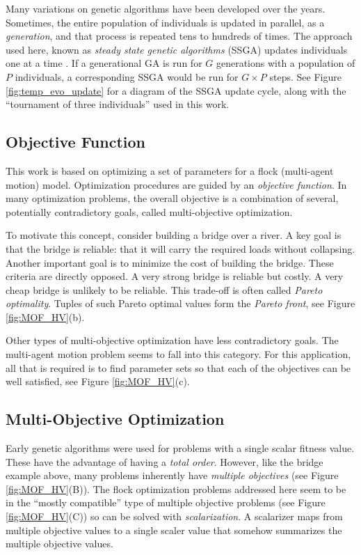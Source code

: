 \documentclass[letterpaper]{article}
\begin{document}
Many variations on genetic algorithms have been developed over the years. Sometimes, the entire population of individuals is updated in parallel, as a \textit{generation}, and that process is repeated tens to hundreds of times. The approach used here, known as \textit{steady state genetic algorithms} (SSGA) updates individuals one at a time \citep{syswerda_study_1991}. If a generational GA is run for $G$ generations with a population of $P$ individuals, a corresponding SSGA would be run for $G{\times}P$ steps. See Figure \ref{fig:temp_evo_update} for a diagram of the SSGA update cycle, along with the ``tournament of three individuals'' used in this work.

\subsection{Objective Function}
\label{subsec:ObjectiveFunction}

This work is based on optimizing a set of parameters for a flock (multi-agent motion) model. Optimization procedures are guided by an \textit{objective function}. In many optimization problems, the overall objective is a combination of several, potentially contradictory goals, called multi-objective optimization. 

To motivate this concept, consider building a bridge over a river. A key goal is that the bridge is reliable: that it will carry the required loads without collapsing. Another important goal is to minimize the cost of building the bridge. These criteria are directly opposed. A very strong bridge is reliable but costly. A very cheap bridge is unlikely to be reliable. This trade-off is often called \textit{Pareto optimality}. Tuples of such Pareto optimal values form the \textit{Pareto front}, see Figure \ref{fig:MOF_HV}(b).

Other types of multi-objective optimization have less contradictory goals. The multi-agent motion problem seems to fall into this category. For this application, all that is required is to find parameter sets so that each of the objectives can be well satisfied, see Figure \ref{fig:MOF_HV}(c).

\subsection{Multi-Objective Optimization}
\label{subsec:Multi-Objective}

Early genetic algorithms were used for problems with a single scalar fitness value. These have the advantage of having a \textit{total order}. However, like the bridge example above, many problems inherently have \textit{multiple objectives} (see Figure \ref{fig:MOF_HV}(B)). The flock optimization problems addressed here seem to be in the ``mostly compatible'' type of multiple objective problems (see Figure \ref{fig:MOF_HV}(C)) so can be solved with \textit{scalarization}. A scalarizer maps from multiple objective values to a single scaler value that somehow summarizes the multiple objective values.
\end{document}
